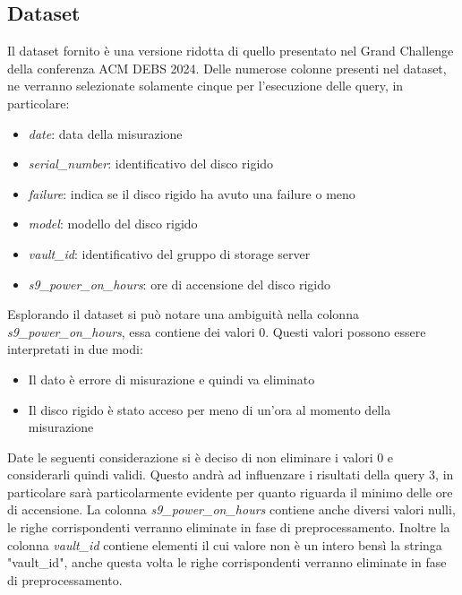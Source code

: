 \documentclass[conference]{IEEEtran}
\begin{document}
\subsection{Dataset}
Il dataset fornito è una versione ridotta di quello presentato nel Grand Challenge della conferenza ACM DEBS 2024. Delle numerose colonne presenti nel dataset, ne verranno selezionate solamente cinque per l'esecuzione delle query, in particolare:
\begin{itemize}
    \item \textit{date}: data della misurazione
    \item \textit{serial\_number}: identificativo del disco rigido
    \item \textit{failure}: indica se il disco rigido ha avuto una failure o meno
    \item \textit{model}: modello del disco rigido
    \item \textit{vault\_id}: identificativo del gruppo di storage server
    \item \textit{s9\_power\_on\_hours}: ore di accensione del disco rigido
\end{itemize}
Esplorando il dataset si può notare una ambiguità nella colonna \textit{s9\_power\_on\_hours}, essa contiene dei valori 0. Questi valori possono essere interpretati in due modi:
\begin{itemize}
    \item Il dato è errore di misurazione e quindi va eliminato
    \item Il disco rigido è stato acceso per meno di un'ora al momento della misurazione
\end{itemize}
Date le seguenti considerazione si è deciso di non eliminare i valori 0 e considerarli quindi validi. Questo andrà ad influenzare i risultati della query 3, in particolare sarà particolarmente evidente per quanto riguarda il minimo delle ore di accensione.
La colonna \textit{s9\_power\_on\_hours} contiene anche diversi valori nulli, le righe corrispondenti verranno eliminate in fase di preprocessamento.
Inoltre la colonna \textit{vault\_id} contiene elementi il cui valore non è un intero bensì la stringa "vault\_id", anche questa volta le righe corrispondenti verranno eliminate in fase di preprocessamento.
\end{document}
